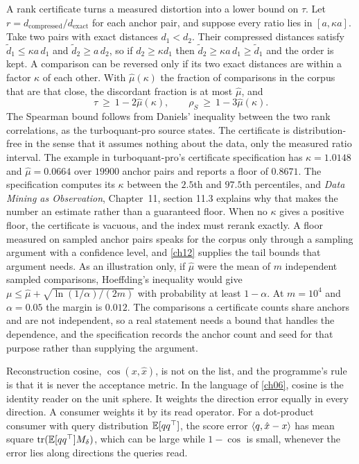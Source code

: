 A rank certificate turns a measured distortion into a lower bound on $\tau$. Let $r=d_{\mathrm{compressed}}/d_{\mathrm{exact}}$ for each anchor pair, and suppose every ratio lies in $[a,\kappa a]$. Take two pairs with exact distances $d_1<d_2$. Their compressed distances satisfy $\tilde d_1\le\kappa a\,d_1$ and $\tilde d_2\ge a\,d_2$, so if $d_2\ge\kappa d_1$ then $\tilde d_2\ge\kappa a\,d_1\ge\tilde d_1$ and the order is kept. A comparison can be reversed only if its two exact distances are within a factor $\kappa$ of each other. With $\hat\mu(\kappa)$ the fraction of comparisons in the corpus that are that close, the discordant fraction is at most $\hat\mu$, and
\begin{equation}\label{eq:ch07:cert}
\tau\ \ge\ 1-2\hat\mu(\kappa),\qquad \rho_S\ \ge\ 1-3\hat\mu(\kappa).
\end{equation}
The Spearman bound follows from Daniels' inequality between the two rank correlations, as the turboquant-pro source states. The certificate is distribution-free in the sense that it assumes nothing about the data, only the measured ratio interval.
The example in turboquant-pro's certificate specification has $\kappa=1.0148$ and $\hat\mu=0.0664$ over $19900$ anchor pairs and reports a floor of $0.8671$. The specification computes its $\kappa$ between the $2.5$th and $97.5$th percentiles, and \emph{Data Mining as Observation}, Chapter~11, section 11.3 explains why that makes the number an estimate rather than a guaranteed floor. When no $\kappa$ gives a positive floor, the certificate is vacuous, and the index must rerank exactly. A floor measured on sampled anchor pairs speaks for the corpus only through a sampling argument with a confidence level, and \cref{ch12} supplies the tail bounds that argument needs. As an illustration only, if $\hat\mu$ were the mean of $m$ independent sampled comparisons, Hoeffding's inequality would give $\mu\le\hat\mu+\sqrt{\ln(1/\alpha)/(2m)}$ with probability at least $1-\alpha$. At $m=10^4$ and $\alpha=0.05$ the margin is $0.012$. The comparisons a certificate counts share anchors and are not independent, so a real statement needs a bound that handles the dependence, and the specification records the anchor count and seed for that purpose rather than supplying the argument.

Reconstruction cosine, $\cos(x,\hat x)$, is not on the list, and the programme's rule is that it is never the acceptance metric. In the language of \cref{ch06}, cosine is the identity reader on the unit sphere. It weights the direction error equally in every direction. A consumer weights it by its read operator. For a dot-product consumer with query distribution $\mathbb{E}[qq^{\top}]$, the score error $\langle q,\hat x-x\rangle$ has mean square $\operatorname{tr}(\mathbb{E}[qq^{\top}]M_\delta)$, which can be large while $1-\cos$ is small, whenever the error lies along directions the queries read.

